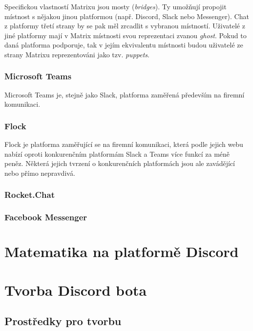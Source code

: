 \documentclass[FM]{tulthesis}
\begin{document}
	Specifickou vlastností Matrixu jsou mosty (\textit{bridges}). Ty umožňují propojit místnost s nějakou jinou platformou (např. Discord, Slack nebo Messenger). Chat z platformy třetí strany by se pak měl zrcadlit s vybranou místností. Uživatelé z jiné platformy mají v Matrix místnosti svou reprezentaci zvanou \textit{ghost}. Pokud to daná platforma podporuje, tak v jejím ekvivalentu místnosti budou uživatelé ze strany Matrixu reprezentováni jako tzv. \textit{puppets}. \cite{doc_Matrix}
	
	\subsection{Microsoft Teams}
	
	Microsoft Teams je, stejně jako Slack, platforma zaměřená především na firemní komunikaci.%
	
	\subsection{Flock}
	
	Flock je platforma zaměřující se na firemní komunikaci, která podle jejich webu nabízí oproti konkurenčním platformám Slack a Teams více funkcí za méně peněz. Některá jejich tvrzení o konkurenčních platformách jsou ale zavádějící nebo přímo nepravdivá.
	
	\subsection{Rocket.Chat}
	
	\subsection{Facebook Messenger}	
	
	\chapter{Matematika na platformě Discord}	
		
	\chapter{Tvorba Discord bota}
	
	\section{Prostředky pro tvorbu}
	
\end{document}
